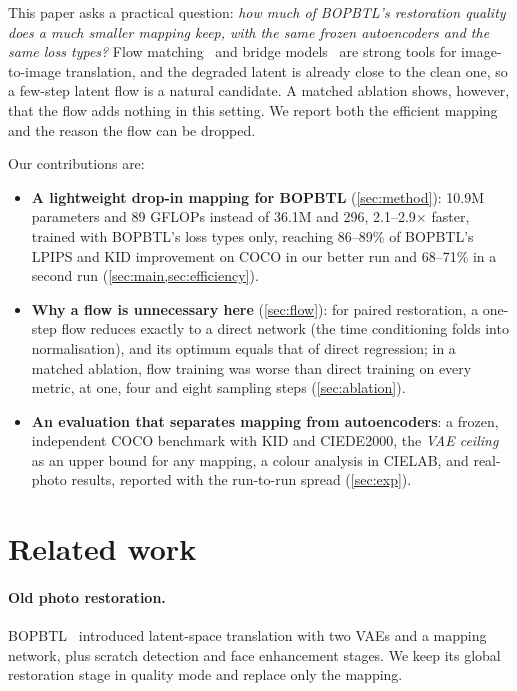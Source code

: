 \documentclass[10pt,twocolumn,letterpaper]{article}
\begin{document}
This paper asks a practical question: \emph{how much of BOPBTL's restoration quality does a much smaller mapping keep,
with the same frozen autoencoders and the same loss types?} Flow
matching~\cite{liu2023flow,lipman2023flow} and bridge models~\cite{liu2023i2sb,shi2023dsbm,albergo2023stochastic} are
strong tools for image-to-image translation, and the degraded latent is already close to the clean one, so a few-step
latent flow is a natural candidate. A matched ablation shows, however, that the flow adds nothing in this setting. We report both the efficient mapping and the reason the flow can be
dropped.

Our contributions are:
\begin{itemize}
  \item \textbf{A lightweight drop-in mapping for BOPBTL} (\cref{sec:method}): 10.9M parameters and 89 GFLOPs instead of
        36.1M and 296, 2.1--2.9$\times$ faster, trained with BOPBTL's loss types only, reaching 86--89\% of BOPBTL's
        LPIPS and KID improvement on COCO in our better run and 68--71\% in a second run (\cref{sec:main,sec:efficiency}).
  \item \textbf{Why a flow is unnecessary here} (\cref{sec:flow}): for paired restoration, a one-step flow reduces exactly
        to a direct network (the time conditioning folds into normalisation), and its optimum equals that of direct
        regression; in a matched ablation, flow training was worse than direct training on every metric, at one, four
        and eight sampling steps (\cref{sec:ablation}).
  \item \textbf{An evaluation that separates mapping from autoencoders}: a frozen, independent COCO benchmark with KID
        and CIEDE2000, the \emph{VAE ceiling} as an upper bound for any mapping, a colour analysis in CIELAB, and
        real-photo results, reported with the run-to-run spread (\cref{sec:exp}).
\end{itemize}

\section{Related work}
\label{sec:related}

\paragraph{Old photo restoration.} BOPBTL~\cite{wan2020bringing,wan2022old} introduced latent-space translation with two
VAEs and a mapping network, plus scratch detection and face enhancement stages. We keep its global restoration stage in
quality mode and replace only the mapping.
\end{document}
